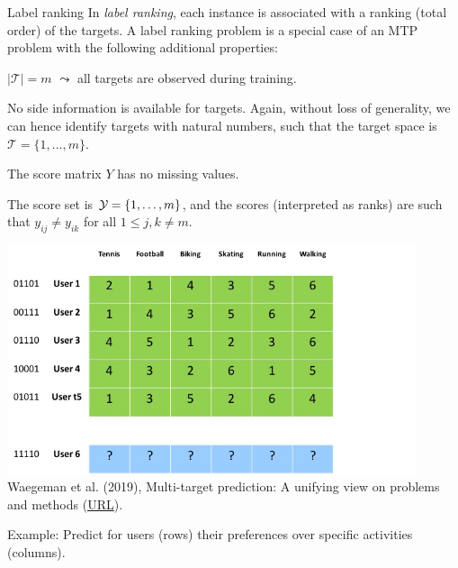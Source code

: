 \documentclass[11pt,compress,t,notes=noshow, xcolor=table]{beamer}
\newcommand{\Tspace}{\mathcal{T}}
\begin{document}
\begin{frame}{Label ranking}
	\small
		In \emph{label ranking}, each instance is associated with a ranking (total order) of the targets.
		A label ranking problem is a special case of an MTP problem with the following additional properties: 
%		
		\begin{enumerate}\small
%			
			\item[P5] $|\Tspace|=m$ $\leadsto$ all targets are observed during training. 
%			
			\item[P6] No side information is available for targets. Again, without loss of generality, we can hence identify targets with natural numbers, such that the target space is $\Tspace = \{1,...,m\}$. 
			
			\item[]
			
			\begin{minipage}{0.5\textwidth}    
				\item[]
%				
			\item[P7] The score matrix $Y$ has no missing values. 
%			
			\item[P8c] The score set is $\mathcal{Y} = \{1, \ldots , m\}$, and the scores (interpreted as ranks) are such that $y_{ij} \neq y_{ik}$ for all $1 \leq j,k \neq m$. 
			\end{minipage}
			\begin{minipage}{0.4\textwidth}    
			\begin{center}
				\includegraphics[width=0.9\textwidth,trim = 0 0 100 0,clip]{figure/labelranking} \tiny
				\\ Waegeman et al. (2019), Multi-target prediction:
				A unifying view on problems and methods (\href{https://arxiv.org/pdf/1809.02352.pdf}{\underline{URL}}).
			\end{center}
		\end{minipage}
		\end{enumerate}
%	
	Example: Predict for users (rows) their preferences over specific activities (columns).
%	
\end{frame}
\end{document}
